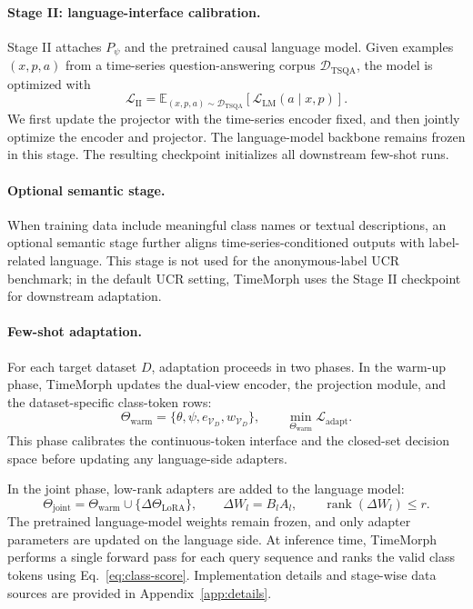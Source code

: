 \documentclass{article}
\begin{document}
\paragraph{Stage II: language-interface calibration.}
Stage II attaches $P_\psi$ and the pretrained causal language model. Given
examples $(x,p,a)$ from a time-series question-answering corpus
$\mathcal{D}_{\mathrm{TSQA}}$, the model is optimized with
\begin{equation}
\label{eq:stage2-loss}
\mathcal{L}_{\mathrm{II}}
=
\mathbb{E}_{(x,p,a)\sim\mathcal{D}_{\mathrm{TSQA}}}
\left[
\mathcal{L}_{\mathrm{LM}}(a\mid x,p)
\right].
\end{equation}
We first update the projector with the time-series encoder fixed, and then jointly
optimize the encoder and projector. The language-model backbone remains frozen in
this stage. The resulting checkpoint initializes all downstream few-shot runs.

\paragraph{Optional semantic stage.}
When training data include meaningful class names or textual descriptions, an
optional semantic stage further aligns time-series-conditioned outputs with
label-related language. This stage is not used for the anonymous-label UCR
benchmark; in the default UCR setting, TimeMorph uses the Stage II checkpoint for
downstream adaptation.

\paragraph{Few-shot adaptation.}
For each target dataset $D$, adaptation proceeds in two phases. In the warm-up
phase, TimeMorph updates the dual-view encoder, the projection module, and the
dataset-specific class-token rows:
\begin{equation}
\label{eq:warmup-params}
\Theta_{\mathrm{warm}}
=
\{
\theta,\psi,e_{\mathcal{V}_D},w_{\mathcal{V}_D}
\},
\qquad
\min_{\Theta_{\mathrm{warm}}}
\mathcal{L}_{\mathrm{adapt}} .
\end{equation}
This phase calibrates the continuous-token interface and the closed-set decision
space before updating any language-side adapters.

In the joint phase, low-rank adapters are added to the language model:
\begin{equation}
\label{eq:lora-params}
\Theta_{\mathrm{joint}}
=
\Theta_{\mathrm{warm}}
\cup
\{
\Delta\Theta_{\mathrm{LoRA}}
\},
\qquad
\Delta W_l=B_lA_l,
\qquad
\operatorname{rank}(\Delta W_l)\le r.
\end{equation}
The pretrained language-model weights remain frozen, and only adapter parameters
are updated on the language side. At inference time, TimeMorph performs a single
forward pass for each query sequence and ranks the valid class tokens using
Eq.~\eqref{eq:class-score}. Implementation details and stage-wise data sources
are provided in Appendix~\ref{app:details}.
\end{document}

